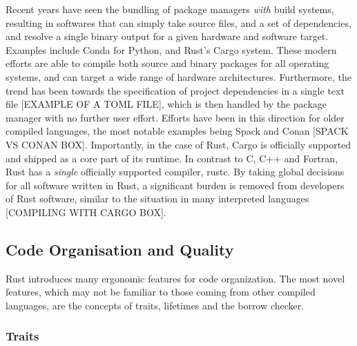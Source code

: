 
Recent years have seen the bundling of package managers \textit{with} build systems, resulting in softwares that can simply take source files, and a set of dependencies, and resolve a single binary output for a given hardware and software target. Examples include Conda for Python, and Rust's Cargo system. These modern efforts are able to compile both source and binary packages for all operating systems, and can target a wide range of hardware architectures. Furthermore, the trend has been towards the specification of project dependencies in a single text file [EXAMPLE OF A TOML FILE], which is then handled by the package manager with no further user effort. Efforts have been in this direction for older compiled languages, the most notable examples being Spack and Conan [SPACK VS CONAN BOX]. Importantly, in the case of Rust, Cargo is officially supported and shipped as a core part of its runtime. In contrast to C, C++ and Fortran, Rust has a \textit{single} officially supported compiler, rustc. By taking global decisions for all software written in Rust, a significant burden is removed from developers of Rust software, similar to the situation in many interpreted languages [COMPILING WITH CARGO BOX].




\subsection*{Code Organisation and Quality}

Rust introduces many ergonomic features for code organization. The most novel features, which may not be familiar to those coming from other compiled languages, are the concepts of traits, lifetimes and the borrow checker.

\subsubsection*{Traits}

